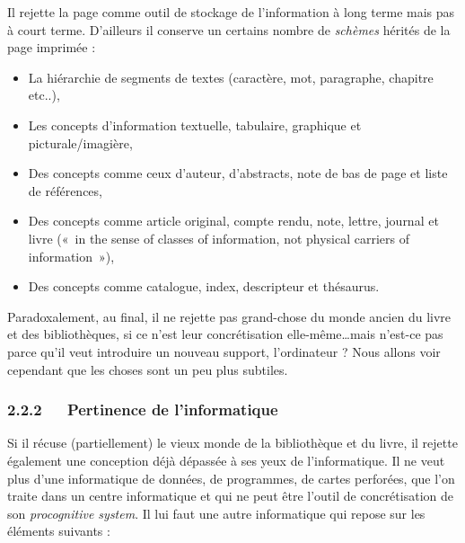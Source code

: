 \documentclass{FramateX}
\begin{document}
\begin{refsection}
Il rejette la page comme outil de stockage de l'information à long terme
mais pas à court terme. D'ailleurs il conserve un certains nombre de
\textit{schèmes} hérités de la page imprimée :

\begin{itemize}
\item La hiérarchie de segments de textes (caractère, mot, paragraphe,
chapitre etc..),
\item Les concepts d'information textuelle, tabulaire, graphique et
picturale/imagière,
\item Des concepts comme ceux d'auteur, d'abstracts, note de bas de page
et liste de références,
\item Des concepts comme article original, compte rendu, note, lettre,
journal et livre («~in the sense of classes of information, not
physical carriers of information~»),
\item Des concepts comme catalogue, index, descripteur et thésaurus.
\end{itemize}



Paradoxalement, au final, il ne rejette pas grand-chose du monde ancien
du livre et des bibliothèques, si ce n'est leur concrétisation
elle-même\ldots mais n'est-ce pas parce qu'il veut introduire un nouveau
support, l'ordinateur ? Nous allons voir cependant que les choses sont
un peu plus subtiles.




\subsubsection*{2.2.2~~~Pertinence de l'informatique}
{}



Si il récuse (partiellement) le vieux monde de la bibliothèque et du
livre, il rejette également une conception déjà dépassée à ses yeux de
l'informatique. Il ne veut plus d'une informatique de données, de
programmes, de cartes perforées, que l'on traite dans un centre
informatique et qui ne peut être l'outil de concrétisation de son
\textit{procognitive system}. Il lui faut une autre informatique qui repose
sur les éléments suivants :


\end{refsection}
\end{document}
